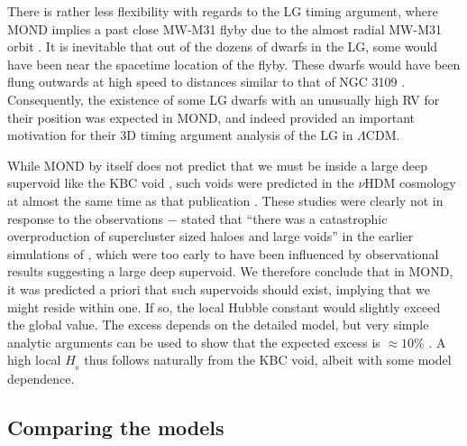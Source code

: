 \documentclass[fleqn,usenatbib,useAMS,onecolumn]{mnras} %
\begin{document}


There is rather less flexibility with regards to the LG timing argument, where MOND implies a past close MW-M31 flyby \citep{Zhao_2013, Banik_Ryan_2018} due to the almost radial MW-M31 orbit \citep{Van_der_Marel_2012, Van_der_Marel_2019, Salomon_2021}. It is inevitable that out of the dozens of dwarfs in the LG, some would have been near the spacetime location of the flyby. These dwarfs would have been flung outwards at high speed to distances similar to that of NGC 3109 \citep{Banik_2018_anisotropy}. Consequently, the existence of some LG dwarfs with an unusually high RV for their position was expected in MOND, and indeed provided an important motivation for their 3D timing argument analysis of the LG in $\Lambda$CDM.

While MOND by itself does not predict that we must be inside a large deep supervoid like the KBC void \citep{Keenan_2013}, such voids were predicted in the $\nu$HDM cosmology at almost the same time as that publication \citep{Angus_2013, Katz_2013}. These studies were clearly not in response to the observations $-$ \citet{Angus_2013} stated that ``there was a catastrophic overproduction of supercluster sized haloes and large voids'' in the earlier simulations of \citet{Angus_Diaferio_2011}, which were too early to have been influenced by observational results suggesting a large deep supervoid. We therefore conclude that in MOND, it was predicted a priori that such supervoids should exist, implying that we might reside within one. If so, the local Hubble constant would slightly exceed the global value. The excess depends on the detailed model, but very simple analytic arguments can be used to show that the expected excess is $\approx 10\%$ \citep[section~1.1 of][]{Haslbauer_2020}. A high local $H_{_0}$ thus follows naturally from the KBC void, albeit with some model dependence.



\subsection{Comparing the models}
\label{LCDM_MOND_comparison}
\end{document}
